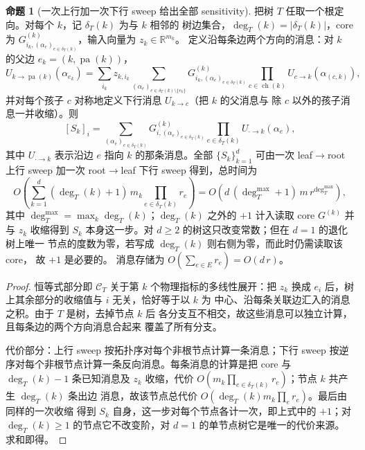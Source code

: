 \documentclass[a4paper,11pt]{article}
\theoremstyle{definition}
\newtheorem{proposition}{命题}
\newcommand{\R}{\mathbb R}
\newcommand{\1}{\mathbf 1}
\newcommand{\pa}{\operatorname{pa}}
\newcommand{\ch}{\operatorname{ch}}
\begin{document}
\begin{proposition}[一次上行加一次下行 sweep 给出全部 sensitivity]
\label{prop:sweep}
把树 $T$ 任取一个根定向。对每个 $k$，记 $\delta_T(k)$ 为与 $k$ 相邻的
树边集合，$\deg_T(k)=|\delta_T(k)|$，core 为
$G^{(k)}_{i_k,(\alpha_e)_{e\in\delta_T(k)}}$，输入向量为 $z_k\in\R^{m_k}$。
定义沿每条边两个方向的消息：对 $k$ 的父边 $e_k=(k,\pa(k))$，
\[
U_{k\to\pa(k)}(\alpha_{e_k})
=
\sum_{i_k}z_{k,i_k}
\sum_{(\alpha_e)_{e\in\delta_T(k)\setminus\{e_k\}}}
G^{(k)}_{i_k,(\alpha_e)_{e\in\delta_T(k)}}
\prod_{c\in\ch(k)}U_{c\to k}(\alpha_{(c,k)}),
\]
并对每个孩子 $c$ 对称地定义下行消息 $U_{k\to c}$（把 $k$ 的父消息与
除 $c$ 以外的孩子消息一并收缩）。则
\[
[S_k]_{i}
=
\sum_{(\alpha_e)_{e\in\delta_T(k)}}
G^{(k)}_{i,(\alpha_e)_{e\in\delta_T(k)}}
\prod_{e\in\delta_T(k)}U_{\cdot\to k}(\alpha_e),
\]
其中 $U_{\cdot\to k}$ 表示沿边 $e$ 指向 $k$ 的那条消息。全部
$\{S_k\}_{k=1}^{d}$ 可由一次 leaf$\to$root 上行 sweep 加一次
root$\to$leaf 下行 sweep 得到，总时间为
\[
O\!\left(\sum_{k=1}^{d}(\deg_T(k)+1)\,m_k\prod_{e\in\delta_T(k)}r_e\right)
=
O\!\left(d\,(\deg_T^{\max}+1)\,m\,r^{\deg_T^{\max}}\right),
\]
其中 $\deg_T^{\max}=\max_k\deg_T(k)$；$\deg_T(k)$ 之外的
$+1$ 计入读取 core $G^{(k)}$ 并与 $z_k$ 收缩得到
$S_k$ 本身这一步。对 $d\ge2$ 的树这只改变常数；但在 $d=1$ 的退化树上唯一
节点的度数为零，若写成 $\deg_T(k)$ 则右侧为零，而此时仍需读取该 core，
故 $+1$ 是必要的。
消息存储为 $O\!\left(\sum_{e\in E}r_e\right)=O(d\,r)$。
\end{proposition}

\begin{proof}
恒等式部分即 $\mathcal C_T$ 关于第 $k$ 个物理指标的多线性展开：把
$z_k$ 换成 $e_i$ 后，树上其余部分的收缩值与 $i$ 无关，恰好等于以 $k$ 为
中心、沿每条关联边汇入的消息之积。由于 $T$ 是树，去掉节点 $k$ 后
各分支互不相交，故这些消息可以独立计算，且每条边的两个方向消息合起来
覆盖了所有分支。

代价部分：上行 sweep 按拓扑序对每个非根节点计算一条消息；下行 sweep
按逆序对每个非根节点计算一条反向消息。每条消息的计算是把 core 与
$\deg_T(k)-1$ 条已知消息及 $z_k$ 收缩，代价
$O(m_k\prod_{e\in\delta_T(k)}r_e)$；节点 $k$ 共产生 $\deg_T(k)$ 条出边
消息，故该节点总代价 $O(\deg_T(k)m_k\prod_{e}r_e)$。最后由同样的一次收缩
得到 $S_k$ 自身，这一步对每个节点各计一次，即上式中的 $+1$；对
$\deg_T(k)\ge1$ 的节点它不改变阶，对 $d=1$ 的单节点树它是唯一的代价来源。
求和即得。
\end{proof}
\end{document}
